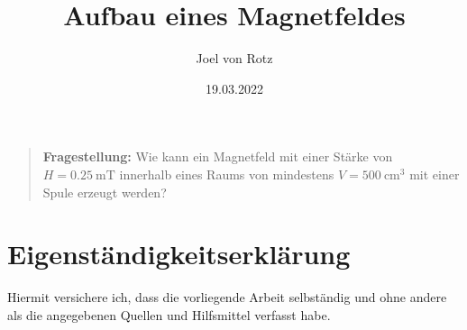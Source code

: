 \documentclass[11pt,a4paper]{article}
\author{Joel von Rotz}
\date{19.03.2022}
\title{Aufbau eines Magnetfeldes}
\begin{document}


\begin{quote}
  \textsf{\textbf{Fragestellung:} Wie kann ein Magnetfeld mit einer Stärke von $H = \SI{0.25}{\milli\tesla}$ innerhalb eines Raums von mindestens $V = \SI{500}{\centi\metre^{3}}$ mit einer Spule erzeugt werden?}
\end{quote}












%

\section{Eigenständigkeitserklärung}

Hiermit versichere ich, dass die vorliegende Arbeit selbständig und ohne andere als die angegebenen Quellen und Hilfsmittel verfasst habe.

\begin{figure}[h]
  \centering
  
  \label{sign_line} 
\end{figure}
\newpage
\end{document}
